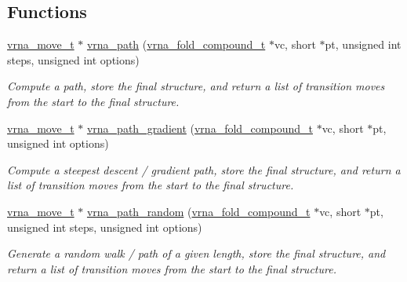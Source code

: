 \subsection*{Functions}
\begin{DoxyCompactItemize}
\item 
\mbox{\hyperlink{group__neighbors_ga08630e00206cd163ea29c462bf5f4755}{vrna\+\_\+move\+\_\+t}} $\ast$ \mbox{\hyperlink{group__paths_gab6aee4143f8b103518d5cbfe6bfe5eae}{vrna\+\_\+path}} (\mbox{\hyperlink{group__fold__compound_ga1b0cef17fd40466cef5968eaeeff6166}{vrna\+\_\+fold\+\_\+compound\+\_\+t}} $\ast$vc, short $\ast$pt, unsigned int steps, unsigned int options)
\begin{DoxyCompactList}\small\item\em Compute a path, store the final structure, and return a list of transition moves from the start to the final structure. \end{DoxyCompactList}\item 
\mbox{\hyperlink{group__neighbors_ga08630e00206cd163ea29c462bf5f4755}{vrna\+\_\+move\+\_\+t}} $\ast$ \mbox{\hyperlink{group__paths_gae92cce443a8a64f7b7fb89867b7d6125}{vrna\+\_\+path\+\_\+gradient}} (\mbox{\hyperlink{group__fold__compound_ga1b0cef17fd40466cef5968eaeeff6166}{vrna\+\_\+fold\+\_\+compound\+\_\+t}} $\ast$vc, short $\ast$pt, unsigned int options)
\begin{DoxyCompactList}\small\item\em Compute a steepest descent / gradient path, store the final structure, and return a list of transition moves from the start to the final structure. \end{DoxyCompactList}\item 
\mbox{\hyperlink{group__neighbors_ga08630e00206cd163ea29c462bf5f4755}{vrna\+\_\+move\+\_\+t}} $\ast$ \mbox{\hyperlink{group__paths_ga9234756c337078fa599529d3db70d913}{vrna\+\_\+path\+\_\+random}} (\mbox{\hyperlink{group__fold__compound_ga1b0cef17fd40466cef5968eaeeff6166}{vrna\+\_\+fold\+\_\+compound\+\_\+t}} $\ast$vc, short $\ast$pt, unsigned int steps, unsigned int options)
\begin{DoxyCompactList}\small\item\em Generate a random walk / path of a given length, store the final structure, and return a list of transition moves from the start to the final structure. \end{DoxyCompactList}\end{DoxyCompactItemize}


